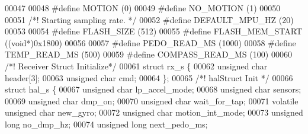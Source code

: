 \begin{DoxyCode}
00047 
00048 \textcolor{preprocessor}{#}\textcolor{preprocessor}{define} \textcolor{preprocessor}{MOTION}          \textcolor{preprocessor}{(}0\textcolor{preprocessor}{)}
00049 \textcolor{preprocessor}{#}\textcolor{preprocessor}{define} \textcolor{preprocessor}{NO\_MOTION}       \textcolor{preprocessor}{(}1\textcolor{preprocessor}{)}
00050 
00051 \textcolor{comment}{/*! Starting sampling rate. */}
00052 \textcolor{preprocessor}{#}\textcolor{preprocessor}{define} \textcolor{preprocessor}{DEFAULT\_MPU\_HZ}  \textcolor{preprocessor}{(}20\textcolor{preprocessor}{)}
00053 
00054 \textcolor{preprocessor}{#}\textcolor{preprocessor}{define} \textcolor{preprocessor}{FLASH\_SIZE}      \textcolor{preprocessor}{(}512\textcolor{preprocessor}{)}
00055 \textcolor{preprocessor}{#}\textcolor{preprocessor}{define} \textcolor{preprocessor}{FLASH\_MEM\_START} \textcolor{preprocessor}{(}\textcolor{preprocessor}{(}\textcolor{keywordtype}{void}\textcolor{preprocessor}{*}\textcolor{preprocessor}{)}0x1800\textcolor{preprocessor}{)}
00056 
00057 \textcolor{preprocessor}{#}\textcolor{preprocessor}{define} \textcolor{preprocessor}{PEDO\_READ\_MS}    \textcolor{preprocessor}{(}1000\textcolor{preprocessor}{)}
00058 \textcolor{preprocessor}{#}\textcolor{preprocessor}{define} \textcolor{preprocessor}{TEMP\_READ\_MS}    \textcolor{preprocessor}{(}500\textcolor{preprocessor}{)}
00059 \textcolor{preprocessor}{#}\textcolor{preprocessor}{define} \textcolor{preprocessor}{COMPASS\_READ\_MS} \textcolor{preprocessor}{(}100\textcolor{preprocessor}{)}
00060 \textcolor{comment}{/*! Receiver Struct Initialize*/}
00061 \textcolor{keyword}{struct} rx_s \{
00062     \textcolor{keywordtype}{unsigned} \textcolor{keywordtype}{char} header[3];
00063     \textcolor{keywordtype}{unsigned} \textcolor{keywordtype}{char} cmd;
00064 \};
00065 \textcolor{comment}{/*! halStruct Init */}
00066 \textcolor{keyword}{struct} hal_s \{
00067     \textcolor{keywordtype}{unsigned} \textcolor{keywordtype}{char} lp_accel_mode;
00068     \textcolor{keywordtype}{unsigned} \textcolor{keywordtype}{char} sensors;
00069     \textcolor{keywordtype}{unsigned} \textcolor{keywordtype}{char} dmp_on;
00070     \textcolor{keywordtype}{unsigned} \textcolor{keywordtype}{char} wait_for_tap;
00071     \textcolor{keyword}{volatile} \textcolor{keywordtype}{unsigned} \textcolor{keywordtype}{char} new_gyro;
00072     \textcolor{keywordtype}{unsigned} \textcolor{keywordtype}{char} motion_int_mode;
00073     \textcolor{keywordtype}{unsigned} \textcolor{keywordtype}{long} no_dmp_hz;
00074     \textcolor{keywordtype}{unsigned} \textcolor{keywordtype}{long} next_pedo_ms;

\end{DoxyCode}
